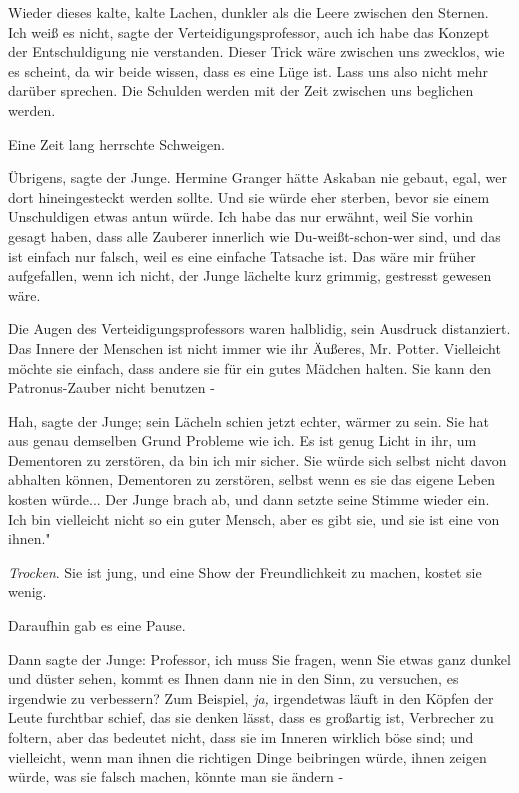 Wieder dieses kalte, kalte Lachen, dunkler als die Leere zwischen den Sternen.
\glqq{}Ich weiß es nicht\grqq{}, sagte der Verteidigungsprofessor, \glqq{}auch ich
habe das Konzept der Entschuldigung nie verstanden. Dieser Trick wäre zwischen
uns zwecklos, wie es scheint, da wir beide wissen, dass es eine Lüge ist. Lass
uns also nicht mehr darüber sprechen. Die Schulden werden mit der Zeit zwischen
uns beglichen werden.\grqq{}

Eine Zeit lang herrschte Schweigen.

\glqq{}Übrigens\grqq{}, sagte der Junge. \glqq{}Hermine Granger hätte Askaban nie
gebaut, egal, wer dort hineingesteckt werden sollte. Und sie würde eher sterben,
bevor sie einem Unschuldigen etwas antun würde. Ich habe das nur erwähnt, weil
Sie vorhin gesagt haben, dass alle Zauberer innerlich wie Du-weißt-schon-wer
sind, und das ist einfach nur falsch, weil es eine einfache Tatsache ist. Das
wäre mir früher aufgefallen, wenn ich nicht\grqq{}, der Junge lächelte kurz
grimmig, \glqq{}gestresst gewesen wäre.\grqq{}

Die Augen des Verteidigungsprofessors waren halblidig, sein Ausdruck
distanziert. \glqq{}Das Innere der Menschen ist nicht immer wie ihr Äußeres, Mr.
Potter. Vielleicht möchte sie einfach, dass andere sie für ein gutes Mädchen
halten. Sie kann den Patronus-Zauber nicht benutzen -\grqq{}

\glqq{}Hah\grqq{}, sagte der Junge; sein Lächeln schien jetzt echter, wärmer zu
sein. \glqq{}Sie hat aus genau demselben Grund Probleme wie ich. Es ist genug
Licht in ihr, um Dementoren zu zerstören, da bin ich mir sicher. Sie würde sich
selbst nicht davon abhalten können, Dementoren zu zerstören, selbst wenn es sie
das eigene Leben kosten würde...\grqq{} Der Junge brach ab, und dann setzte
seine Stimme wieder ein. \glqq{}Ich bin vielleicht nicht so ein guter Mensch,
aber es gibt sie, und sie ist eine von ihnen."

\emph{Trocken}. \glqq{}Sie ist jung, und eine Show der Freundlichkeit zu machen,
kostet sie wenig.\grqq{}

Daraufhin gab es eine Pause.

Dann sagte der Junge: \glqq{}Professor, ich muss Sie fragen, wenn Sie etwas ganz
dunkel und düster sehen, kommt es Ihnen dann nie in den Sinn, zu versuchen, es
irgendwie zu verbessern? Zum Beispiel,\emph{ ja,} irgendetwas läuft in den
Köpfen der Leute furchtbar schief, das sie denken lässt, dass es großartig ist,
Verbrecher zu foltern, aber das bedeutet nicht, dass sie im Inneren wirklich
böse sind; und vielleicht, wenn man ihnen die richtigen Dinge beibringen würde,
ihnen zeigen würde, was sie falsch machen, könnte man sie ändern -\grqq{}

